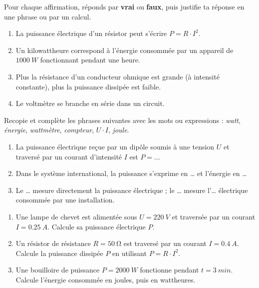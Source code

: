 \documentclass[11pt]{article}
\begin{document}
\begin{exercice}
Pour chaque affirmation, réponds par \textbf{vrai} ou \textbf{faux}, puis justifie ta réponse en une phrase ou par un calcul.
\begin{enumerate}
\item La puissance électrique d'un résistor peut s'écrire $P = R \cdot I^2$.
\item Un kilowattheure correspond à l'énergie consommée par un appareil de $\SI{1000}{W}$ fonctionnant pendant une heure.
\item Plus la résistance d'un conducteur ohmique est grande (à intensité constante), plus la puissance dissipée est faible.
\item Le voltmètre se branche en série dans un circuit.
\end{enumerate}
\end{exercice}

\begin{exercice}
Recopie et complète les phrases suivantes avec les mots ou expressions : \emph{watt}, \emph{énergie}, \emph{wattmètre}, \emph{compteur}, \emph{$U \cdot I$}, \emph{joule}.
\begin{enumerate}
\item La puissance électrique reçue par un dipôle soumis à une tension $U$ et traversé par un courant d'intensité $I$ est $P = \ldots$
\item Dans le système international, la puissance s'exprime en \ldots{} et l'énergie en \ldots
\item Le \ldots{} mesure directement la puissance électrique ; le \ldots{} mesure l'\ldots{} électrique consommée par une installation.
\end{enumerate}
\end{exercice}

\begin{exercice}
\begin{enumerate}
\item Une lampe de chevet est alimentée sous $U = \SI{220}{V}$ et traversée par un courant $I = \SI{0,25}{A}$. Calcule sa puissance électrique $P$.
\item Un résistor de résistance $R = \SI{50}{\ohm}$ est traversé par un courant $I = \SI{0,4}{A}$. Calcule la puissance dissipée $P$ en utilisant $P = R \cdot I^2$.
\item Une bouilloire de puissance $P = \SI{2000}{W}$ fonctionne pendant $t = \SI{3}{min}$. Calcule l'énergie consommée en joules, puis en wattheures.
\end{enumerate}
\end{exercice}
\end{document}
